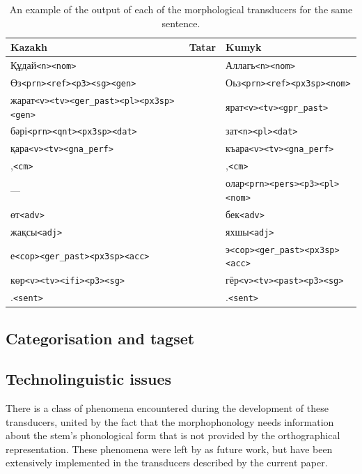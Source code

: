 \documentclass[a4paper,11pt,twocolumn]{article}
\newcommand{\tags}[1]{\texttt{#1}}
\begin{document}
\begin{table}
\begin{tabular}{lll}
 \textbf{Kazakh} & \textbf{Tatar} & \textbf{Kumyk} \\
\hline
 Құдай\tags{<n><nom>} &  & Аллагь\tags{<n><nom>}  \\
 Өз\tags{<prn><ref><p3><sg><gen>} & & Оьз\tags{<prn><ref><px3sp><nom>} \\
 жарат\tags{<v><tv><ger\_past><pl><px3sp><gen>} & & ярат\tags{<v><tv><gpr\_past>} \\
 бәрі\tags{<prn><qnt><px3sp><dat>} & & зат\tags{<n><pl><dat>} \\
 қара\tags{<v><tv><gna\_perf>} & & къара\tags{<v><tv><gna\_perf>} \\ 
 ,\tags{<cm>} & & ,\tags{<cm>} \\
 ---      & & олар\tags{<prn><pers><p3><pl><nom>} \\
 өт\tags{<adv>} & & бек\tags{<adv>} \\
 жақсы\tags{<adj>} & & яхшы\tags{<adj>} \\
 е\tags{<cop><ger\_past><px3sp><acc>} & & э\tags{<cop><ger\_past><px3sp><acc>} \\
 көр\tags{<v><tv><ifi><p3><sg>} & & гёр\tags{<v><tv><past><p3><sg>} \\  
 .\tags{<sent>} & & .\tags{<sent>} \\
\hline
\end{tabular}

\label{table:exoutput}
\caption{An example of the output of each of the morphological transducers for the same sentence.}

\end{table}

\subsection{Categorisation and tagset}

\subsection{Technolinguistic issues} %
There is a class of phenomena encountered during the development of these transducers, united by the fact that the morphophonology needs information about the stem's phonological form that is not provided by the orthographical representation.  These phenomena were left by \citet{washington2012} as future work, but have been extensively implemented in the transducers described by the current paper.
\end{document}
